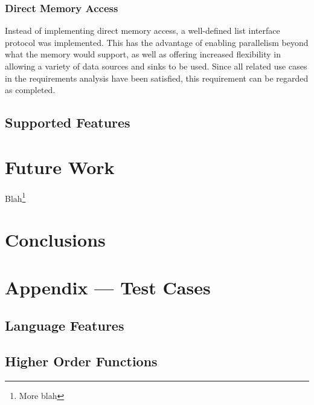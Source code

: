 \documentclass[english,onecolumn]{scrartcl}
\begin{document}
\subsubsection{Direct Memory Access}
\label{sec:reqDMA}
Instead of implementing direct memory access, a well-defined list interface protocol was implemented. This has the advantage of
enabling parallelism beyond what the memory would support, as well as offering increased flexibility in allowing a variety of data
sources and sinks to be used. Since all related use cases in the requirements analysis have been satisfied, this requirement can
be regarded as completed.


\subsection{Supported Features}


\section{Future Work}

Blah\footnote{More blah}


\section{Conclusions}


\pagebreak{}
\appendix
\section{Appendix --- Test Cases}
\subsection{Language Features}






\subsection{Higher Order Functions}




\end{document}
